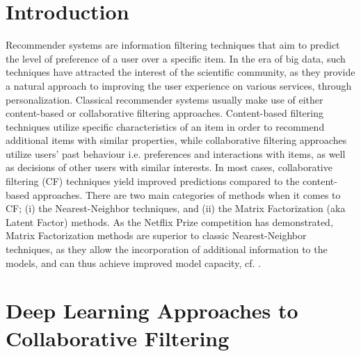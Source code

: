 \section*{Introduction}
Recommender systems are information filtering techniques that aim to predict the level of preference of a user over a specific item. In the era of big data, such techniques have attracted the interest of the scientific community, as they provide a natural approach to improving the user experience on various services, through personalization.
Classical recommender systems usually make use of either content-based or collaborative filtering approaches. Content-based filtering techniques utilize specific characteristics of an item in order to recommend additional items with similar properties, while collaborative filtering approaches utilize users' past behaviour i.e. preferences and interactions with items, as well as decisions of other users with similar interests. In most cases, collaborative filtering (CF) techniques yield improved predictions compared to the content-based approaches.
There are two main categories of methods when it comes to CF; (i) the Nearest-Neighbor techniques, and (ii) the Matrix Factorization (aka Latent Factor) methods.
As the Netflix Prize competition has demonstrated, Matrix Factorization methods are superior to classic Nearest-Neighbor techniques, as they allow the incorporation of additional information to the models, and can thus achieve improved model capacity, cf. \cite{koren2009matrix}.

\section*{Deep Learning Approaches to Collaborative Filtering}

